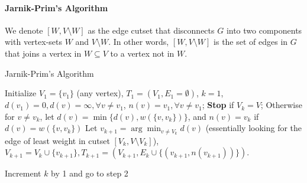 \paragraph{Jarnik-Prim's Algorithm}
We denote $[W,V\setminus W]$ as the edge cutset that disconnects $G$ into two components with vertex-sets $W$ and $V\setminus W$.
In other words, $[W,V\setminus W]$ is the set of edges in $G$ that joins a vertex in $W\subseteq V$ to a vertex not in $W$.
\begin{algorithm}[htb] 
\caption{Jarnik-Prim's Algorithm} 
\label{alg:SM} 
\begin{algorithmic}[1] %
\STATE 
Initialize $V_1=\{v_1\}$ (any vertex), $T_1=(V_1,E_1=\emptyset)$, $k=1$, $d(v_1)=0,d(v)=\infty,\forall v\ne v_1$, $n(v)=v_1,\forall v\ne v_1$;
\STATE
\textbf{Stop} if $V_k=V$;
\STATE
Otherwise for $v\ne v_k$, let $d(v)=\min\{d(v),w(\{v,v_k\})\}$, and $n(v)=v_k$ if $d(v)=w(\{v,v_k\})$
\STATE
Let $v_{k+1} =\arg\min_{v\ne V_k}d(v)$ (essentially looking for the edge of least weight in cutset $[V_k,V\setminus V_k]$), $V_{k+1}=V_k\cup\{v_{k+1}\},T_{k+1}=(V_{k+1},E_k\cup\{(v_{k+1},n(v_{k+1}))\})$.

Increment $k$ by 1 and go to step 2
\end{algorithmic}
\end{algorithm}
















